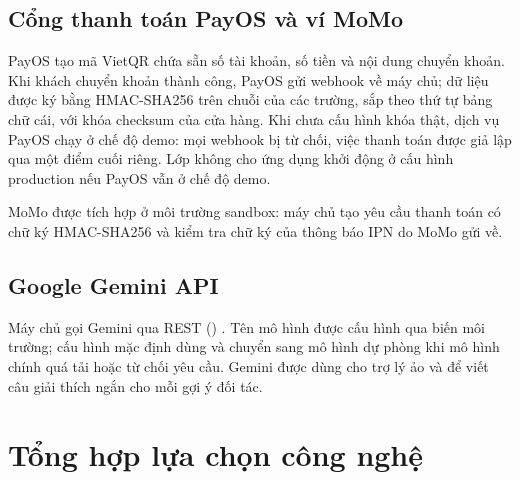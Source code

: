\subsection{Cổng thanh toán PayOS và ví MoMo}
PayOS \cite{payos_docs} tạo mã VietQR chứa sẵn số tài khoản, số tiền và nội dung chuyển khoản. Khi khách chuyển khoản thành công, PayOS gửi webhook về máy chủ; dữ liệu được ký bằng HMAC-SHA256 trên chuỗi  của các trường, sắp theo thứ tự bảng chữ cái, với khóa checksum của cửa hàng. Khi chưa cấu hình khóa thật, dịch vụ PayOS chạy ở chế độ demo: mọi webhook bị từ chối, việc thanh toán được giả lập qua một điểm cuối riêng. Lớp  không cho ứng dụng khởi động ở cấu hình production nếu PayOS vẫn ở chế độ demo.

MoMo \cite{momo_docs} được tích hợp ở môi trường sandbox: máy chủ tạo yêu cầu thanh toán có chữ ký HMAC-SHA256 và kiểm tra chữ ký của thông báo IPN do MoMo gửi về.

\subsection{Google Gemini API}
Máy chủ gọi Gemini qua REST () \cite{google_gemini_api}. Tên mô hình được cấu hình qua biến môi trường; cấu hình mặc định dùng  và chuyển sang mô hình dự phòng  khi mô hình chính quá tải hoặc từ chối yêu cầu. Gemini được dùng cho trợ lý ảo và để viết câu giải thích ngắn cho mỗi gợi ý đối tác.

\section{Tổng hợp lựa chọn công nghệ}
\label{sec:tonghop_congnghe}

